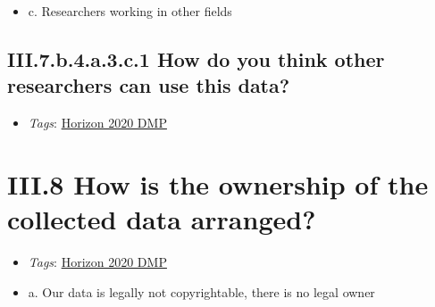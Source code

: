 \documentclass[a4paper,12pt]{report}
\begin{document}
\begin{itemize}
  \item[\CheckmarkBold] c. Researchers working in other fields
\end{itemize}




\subsection*{\protect\textcolor{colorSecId}{III.7.b.4.a.3.c.1} How do you think other researchers can use this data?}

\label{b1df3c74-0b1f-4574-81c4-4cc2d780c1af.f038bd46-ee4e-4f53-b7ea-482381c2c855.4fd89b13-f33c-4858-8b25-ab6da271efc6.b642c31d-a512-4ca7-8743-a2e0254006fa.539c5087-3111-4e57-92e3-8a00ec1c1b82.c520b63c-cc35-4789-9d98-cc87b59ebcf1.0c630b6f-8aec-4153-818d-90fbb559072f.41a1b4ba-8cd5-47fe-a7be-06cccf9a1688}


\begin{itemize}
  \item \textit{Tags}: \ul{Horizon 2020 DMP}
  \end{itemize}








\section*{\protect\textcolor{colorSecId}{III.8} How is the ownership of the collected data arranged?}

\label{b1df3c74-0b1f-4574-81c4-4cc2d780c1af.cb7d17a8-30c0-489d-a43c-702b27d97611}


\begin{itemize}
  \item \textit{Tags}: \ul{Horizon 2020 DMP}
  \end{itemize}




\begin{itemize}
  \item[\CheckmarkBold] a. Our data is legally not copyrightable, there is no legal owner
\end{itemize}
\end{document}
